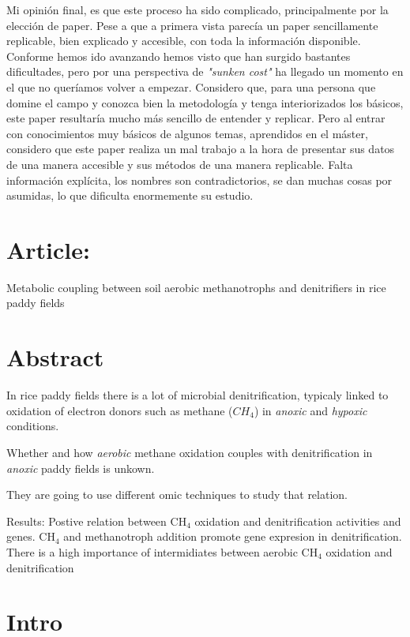 \documentclass{article}
\begin{document}
Mi opinión final, es que este proceso ha sido complicado, principalmente por la elección de paper. Pese a que a primera vista parecía un paper sencillamente replicable, bien explicado y accesible, con toda la información disponible. Conforme hemos ido avanzando hemos visto que han surgido bastantes dificultades, pero por una perspectiva de \textit{"sunken cost"} ha llegado un momento en el que no queríamos volver a empezar. Considero que, para una persona que domine el campo y conozca bien la metodología y tenga interiorizados los básicos, este paper resultaría mucho más sencillo de entender y replicar. Pero al entrar con conocimientos muy básicos de algunos temas, aprendidos en el máster, considero que este paper realiza un mal trabajo a la hora de presentar sus datos de una manera accesible y sus métodos de una manera replicable. Falta información explícita, los nombres son contradictorios, se dan muchas cosas por asumidas, lo que dificulta enormemente su estudio.

\section{Article:}

Metabolic coupling between soil aerobic methanotrophs and denitriﬁers in rice paddy ﬁelds

\section{Abstract}

In rice paddy fields there is a lot of microbial denitrification, typicaly linked to oxidation of electron donors such as methane ($CH_4$) in \textit{anoxic} and \textit{hypoxic} conditions.

Whether and how \textit{aerobic} methane oxidation couples with denitrification in \textit{anoxic} paddy fields is unkown.

They are going to use different omic techniques to study that relation.

Results:
Postive relation between CH$_4$ oxidation and denitrification activities and genes.
CH$_4$ and methanotroph addition promote gene expresion in denitrification.
There is a high importance of intermidiates between aerobic CH$_4$ oxidation and denitrification

\section{Intro}
\end{document}
